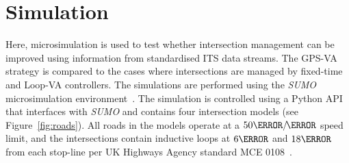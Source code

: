 \documentclass[numbered]{trbunofficial}
\newcommand{\sidiv}{/\hspace{-1.5pt}} %
\begin{document}
\section{Simulation}\label{sec:sim}
Here, microsimulation is used to test whether intersection management can be improved using information from standardised ITS data streams. The GPS-VA strategy is compared to the cases where intersections are managed by fixed-time and Loop-VA controllers. The simulations are performed using the \emph{SUMO} microsimulation environment~\cite{Krajzewicz2006}. The simulation is controlled using a Python API~\cite{python, traci1, box} that interfaces with \emph{SUMO} and contains four intersection models (see Figure~\ref{fig:roads}). All roads in the models operate at a $50\km\sidiv\hour$ speed limit, and the intersections contain inductive loops at $6\m$ and $18\m$ from each stop-line per UK Highways Agency standard MCE 0108~\cite{mce0108a}.
\end{document}
